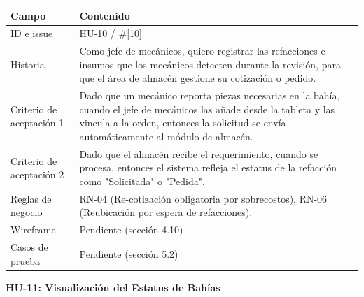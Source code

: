 {\def\LTcaptype{none} %
\begin{longtable}[]{@{}
  >{\raggedright\arraybackslash}p{}
  >{\raggedright\arraybackslash}p{}@{}}
\toprule\noalign{}
\begin{minipage}[b]{\linewidth}\raggedright
\textbf{Campo}
\end{minipage} & \begin{minipage}[b]{\linewidth}\raggedright
\textbf{Contenido}
\end{minipage} \\
\midrule\noalign{}
\endhead
\bottomrule\noalign{}
\endlastfoot
ID e issue & HU-10 / \#{[}10{]} \\
Historia & Como jefe de mecánicos, quiero registrar las refacciones e
insumos que los mecánicos detecten durante la revisión, para que el área
de almacén gestione su cotización o pedido. \\
Criterio de aceptación 1 & Dado que un mecánico reporta piezas
necesarias en la bahía, cuando el jefe de mecánicos las añade desde la
tableta y las vincula a la orden, entonces la solicitud se envía
automáticamente al módulo de almacén. \\
Criterio de aceptación 2 & Dado que el almacén recibe el requerimiento,
cuando se procesa, entonces el sistema refleja el estatus de la
refacción como "Solicitada" o "Pedida". \\
Reglas de negocio & RN-04 (Re-cotización obligatoria por sobrecostos),
RN-06 (Reubicación por espera de refacciones). \\
Wireframe & Pendiente (sección 4.10) \\
Casos de prueba & Pendiente (sección 5.2) \\
\end{longtable}
}

\textbf{HU-11: Visualización del Estatus de Bahías}

